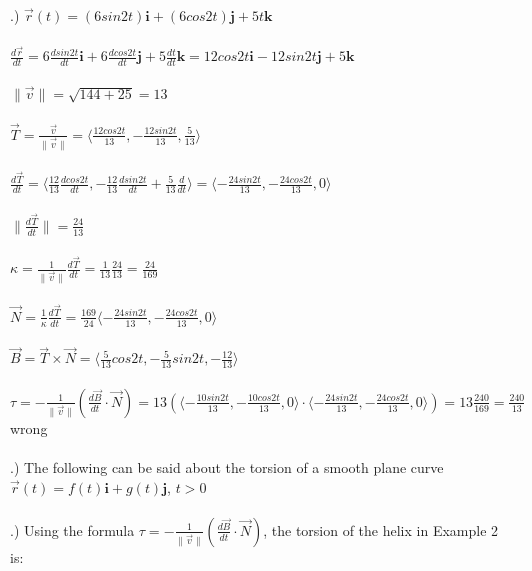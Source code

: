 \documentclass[12pt]{article}
\begin{document}
.) $\vec{r}(t) = (6sin{2t})\mathbf{i} + (6cos{2t})\mathbf{j} + 5t\mathbf{k}$\\\\
\noindent $\frac{d\vec{r}}{dt} = 6\frac{dsin{2t}}{dt}\mathbf{i} + 6\frac{dcos{2t}}{dt}\mathbf{j} + 5\frac{dt}{dt}\mathbf{k} =
12cos{2t}\mathbf{i} - 12sin{2t}\mathbf{j} + 5\mathbf{k}$\\\\
\noindent $\| \vec{v} \| = \sqrt{144 + 25} = 13 $\\\\
\noindent $\vec{T} = \frac{\vec{v}}{\| \vec{v} \|} = \langle \frac{12cos{2t}}{13}, -\frac{12sin{2t}}{13}, \frac{5}{13}\rangle$\\\\
\noindent $\frac{d\vec{T}}{dt} = \langle \frac{12}{13}\frac{dcos{2t}}{dt} , -\frac{12}{13}\frac{dsin{2t}}{dt} + \frac{5}{13}\frac{d}{dt}\rangle
= \langle -\frac{24sin{2t}}{13}, -\frac{24cos{2t}}{13}, 0 \rangle$\\\\
\noindent $\| \frac{d\vec{T}}{dt} \|  = \frac{24}{13}$\\\\
\noindent $\kappa = \frac{1}{\| \vec{v} \| }\frac{d\vec{T}}{dt} = \frac{1}{13}\frac{24}{13} =\frac{24}{169}$\\\\
\noindent $\vec{N} = \frac{1}{\kappa}\frac{d\vec{T}}{dt} = \frac{169}{24}\langle -\frac{24sin{2t}}{13}, -\frac{24cos{2t}}{13}, 0\rangle $\\\\
\noindent $\vec{B} = \vec{T} \times \vec{N} = \langle \frac{5}{13}cos{2t}, -\frac{5}{13}sin{2t}, -\frac{12}{13}\rangle$\\\\
\noindent $\tau = -\frac{1}{\| \vec{v} \| }(\frac{d\vec{B}}{dt}\cdot \vec{N}) = 13(\langle -\frac{10sin{2t}}{13}, -\frac{10cos{2t}}{13}, 0\rangle \cdot \langle -\frac{24sin{2t}}{13}, -\frac{24cos{2t}}{13}, 0\rangle) = 13\frac{240}{169} = \frac{240}{13}$ wrong\\\\
.) The following can be said about the torsion of a smooth plane curve $\vec{r}(t) = f(t)\mathbf{i} + g(t)\mathbf{j}$, \hspace{10pt} $t > 0$\\\\
.) Using the formula $\tau = -\frac{1}{\| \vec{v} \|}(\frac{d\vec{B}}{dt} \cdot \vec{N})$, the torsion of the helix in Example 2 is:\\\\
\end{document}
